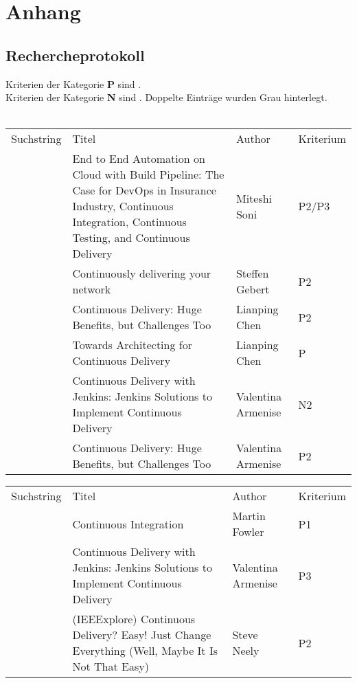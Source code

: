 \chapter{Anhang}
\label{chap:anhang}

\section{Rechercheprotokoll}
\label{sec:rechercheprotokoll}
Kriterien der Kategorie \textbf{P} sind .\\
Kriterien der Kategorie \textbf{N} sind . Doppelte Einträge wurden Grau hinterlegt.
\\\\
\noindent
\begin{tabular}{|l|L{8cm}|l|l|}
\hline
     \\ \hline
    Suchstring & Titel & Author & Kriterium\\ \hline
     & End to End Automation on Cloud with Build Pipeline: The Case for DevOps in Insurance Industry, Continuous Integration, Continuous Testing, and Continuous Delivery & Miteshi Soni & P2/P3 \\ \hline
     & Continuously delivering your network & Steffen Gebert & P2\\ \hline
     & Continuous Delivery: Huge Benefits, but Challenges Too & Lianping Chen & P2\\ \hline
     & Towards Architecting for Continuous Delivery & Lianping Chen & P \\ \hline
    
     & Continuous Delivery with Jenkins: Jenkins Solutions to Implement Continuous Delivery & Valentina Armenise & N2 \\ \hline
     & Continuous Delivery: Huge Benefits, but Challenges Too & Valentina Armenise & P2 \\ \hline
\end{tabular} 
\noindent
\begin{tabular}{|l|L{8cm}|l|l|} \hline
      \\ \hline
    Suchstring & Titel & Author & Kriterium\\ \hline
     & Continuous Integration & Martin Fowler & P1 \\ \hline
    
     & Continuous Delivery with Jenkins: Jenkins Solutions to Implement Continuous Delivery & Valentina Armenise & P3\\ \hline
     &  (IEEExplore) Continuous Delivery? Easy! Just Change Everything (Well, Maybe It Is Not That Easy) & Steve Neely & P2\\ \hline
\end{tabular} 
\noindent
